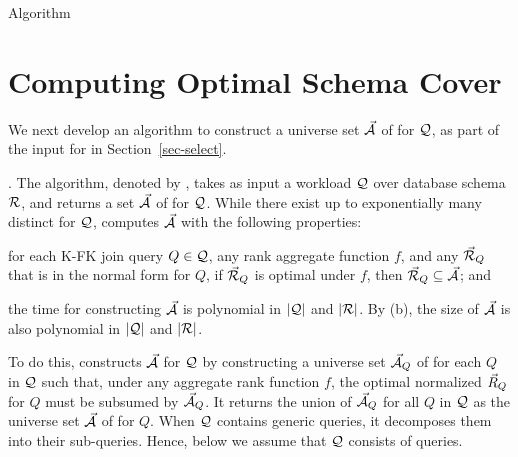 {{\begin{myfloat}[t]
\begin{minipage}{0.50\textwidth}
{\begin{algorithm}[H]
\nonl{}
\nonl{}
\vspace{0.3cm}
\nonl{}
\nonl {}
\caption{Algorithm \usc\label{alg-usc}} 
\end{algorithm}
\DecMargin{1em}
}
\end{minipage}
\vspace{-2.4ex}
\end{myfloat}
}%


\section{Computing Optimal Schema Cover}
\label{sec-cover}

We next develop an algorithm to construct a universe set
$\vec{{\mathcal A}}$ of \bss for $\mathcal Q$, as part of the input for \opts in
Section~\ref{sec-select}.

. The algorithm, denoted by \usc, takes as input a workload $\mathcal Q$
over database schema ${\mathcal R}$, and returns a set $\vec{{\mathcal A}}$ of \bss
for $\mathcal Q$.
While there exist up to exponentially many distinct \bss for
$\mathcal Q$, \usc computes $\vec{{\mathcal A}}$ with the following properties:
\bi
\item[(a)] for each K-FK join \SPC query $Q\in \mathcal Q$, any rank aggregate function $f$,
  and any \bds $\vec{{\mathcal R}}_{Q}$ that is in the normal form for $Q$,
  if $\vec{{\mathcal R}}_{Q}$ is optimal under $f$, then
  $\vec{{\mathcal R}}_{Q}\subseteq \vec{{\mathcal A}}$; and
\item[(b)] the time for constructing $\vec{{\mathcal A}}$ is polynomial in
  $|\mathcal Q|$ and $|{\mathcal R}|$.
\ei
By (b), the size of $\vec{{\mathcal A}}$ is also polynomial in
$|\mathcal Q|$ and $|{\mathcal R}|$.

To do this, \usc constructs $\vec{{\mathcal A}}$ for $\mathcal Q$ by
constructing a universe set $\vec{{\mathcal A}}_{Q}$ of \bss for each $Q$ in $\mathcal Q$
such that, under any aggregate rank function $f$, the optimal
normalized \bds $\vec{R}_{Q}$ for $Q$ must be subsumed by $\vec{{\mathcal A}}_{Q}$.
It returns the union of $\vec{{\mathcal A}}_{Q}$ for all $Q$ in $\mathcal Q$ as
the universe set $\vec{{\mathcal A}}$ of \bss for $Q$. When $\mathcal Q$ contains
generic \SQL queries, it decomposes them into their \SPC
sub-queries. Hence, below we assume that $\mathcal Q$ consists of \SPC queries.

}
